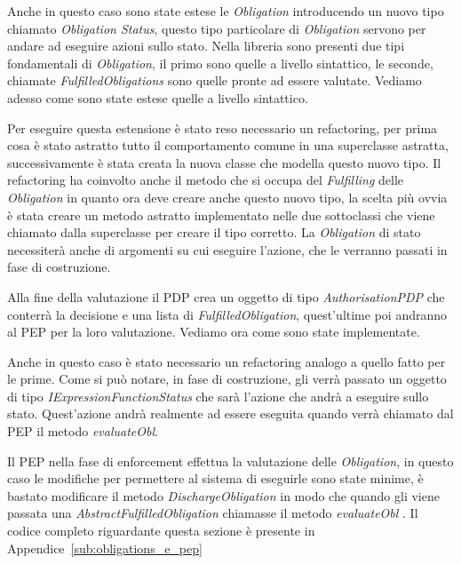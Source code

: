 Anche in questo caso sono state estese le \textit{Obligation} introducendo un nuovo tipo chiamato \textit{Obligation Status}, questo tipo particolare di \textit{Obligation} servono per andare ad eseguire azioni sullo stato.
Nella libreria sono presenti due tipi fondamentali di \textit{Obligation}, il primo sono quelle a livello sintattico, le seconde, chiamate \textit{FulfilledObligations} sono quelle pronte ad essere valutate. Vediamo adesso come sono state estese quelle a livello sintattico.\\ \par
Per eseguire questa estensione è stato reso necessario un refactoring, per prima cosa è stato astratto tutto il comportamento comune in una superclasse astratta, successivamente è stata creata la nuova classe che modella questo nuovo tipo.
Il refactoring ha coinvolto anche il metodo che si occupa del \textit{Fulfilling} delle \textit{Obligation} in quanto ora deve creare anche questo nuovo tipo, la scelta più ovvia è stata creare un metodo astratto implementato nelle due sottoclassi che viene chiamato dalla superclasse per creare il tipo corretto.
La \textit{Obligation} di stato necessiterà anche di argomenti su cui eseguire l'azione, che le verranno passati in fase di costruzione.\\ \par
Alla fine della valutazione il PDP crea un oggetto di tipo \textit{AuthorisationPDP} che conterrà la decisione e una lista di \textit{FulfilledObligation}, quest'ultime poi andranno al PEP per la loro valutazione. Vediamo ora come sono state implementate.\\ \par
Anche in questo caso è stato necessario un refactoring analogo a quello fatto per le prime.
Come si può notare, in fase di costruzione, gli verrà passato un oggetto di tipo \textit{IExpressionFunctionStatus} che sarà l'azione che andrà a eseguire sullo stato. Quest'azione andrà realmente ad essere eseguita quando verrà chiamato dal PEP il metodo \textit{evaluateObl}.\\ \par
Il PEP nella fase di enforcement effettua la valutazione delle \textit{Obligation}, in questo caso le modifiche per permettere al sistema di eseguirle sono state minime, è bastato modificare il metodo \textit{DischargeObligation} in modo che quando gli viene passata una \textit{AbstractFulfilledObligation} chiamasse il metodo \textit{evaluateObl} .
Il codice completo riguardante questa sezione è presente in Appendice~\ref{sub:obligations_e_pep}


